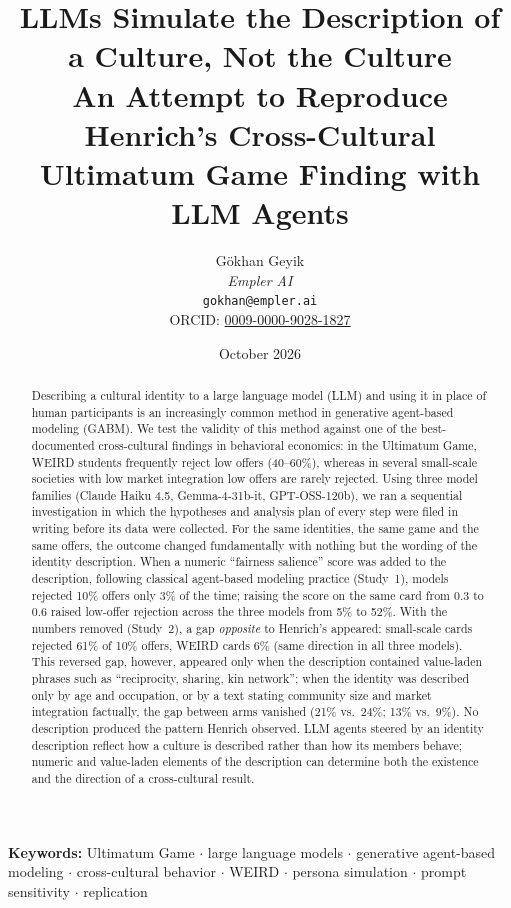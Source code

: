 \documentclass[11pt]{article}
\title{\textbf{LLMs Simulate the Description of a Culture, Not the Culture}\\[0.3em]
\large An Attempt to Reproduce Henrich's Cross-Cultural Ultimatum Game Finding with LLM Agents}
\author{Gökhan Geyik\\\textit{Empler AI}\\\texttt{gokhan@empler.ai}\\ORCID: \href{https://orcid.org/0009-0000-9028-1827}{0009-0000-9028-1827}}
\date{October 2026}
\begin{document}
\maketitle

\begin{abstract}
\noindent
Describing a cultural identity to a large language model (LLM) and using it in place of human participants is an increasingly common method in generative agent-based modeling (GABM). We test the validity of this method against one of the best-documented cross-cultural findings in behavioral economics: in the Ultimatum Game, WEIRD students frequently reject low offers (40--60\%), whereas in several small-scale societies with low market integration low offers are rarely rejected. Using three model families (Claude Haiku 4.5, Gemma-4-31b-it, GPT-OSS-120b), we ran a sequential investigation in which the hypotheses and analysis plan of every step were filed in writing before its data were collected. For the same identities, the same game and the same offers, the outcome changed fundamentally with nothing but the wording of the identity description. When a numeric ``fairness salience'' score was added to the description, following classical agent-based modeling practice (Study~1), models rejected 10\% offers only 3\% of the time; raising the score on the same card from 0.3 to 0.6 raised low-offer rejection across the three models from 5\% to 52\%. With the numbers removed (Study~2), a gap \emph{opposite} to Henrich's appeared: small-scale cards rejected 61\% of 10\% offers, WEIRD cards 6\% (same direction in all three models). This reversed gap, however, appeared only when the description contained value-laden phrases such as ``reciprocity, sharing, kin network''; when the identity was described only by age and occupation, or by a text stating community size and market integration factually, the gap between arms vanished (21\% vs.\ 24\%; 13\% vs.\ 9\%). No description produced the pattern Henrich observed. LLM agents steered by an identity description reflect how a culture is described rather than how its members behave; numeric and value-laden elements of the description can determine both the existence and the direction of a cross-cultural result.
\end{abstract}

\textbf{Keywords:} Ultimatum Game $\cdot$ large language models $\cdot$ generative agent-based modeling $\cdot$ cross-cultural behavior $\cdot$ WEIRD $\cdot$ persona simulation $\cdot$ prompt sensitivity $\cdot$ replication
\end{document}
